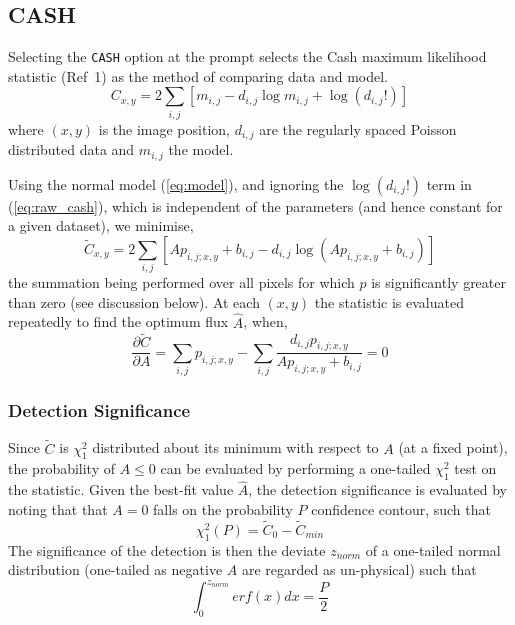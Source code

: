 \subsection{CASH}
\label{alg:cash}
Selecting the \verb+CASH+ option at the  prompt selects the
Cash maximum likelihood statistic (Ref~1) as the method of comparing
data and model.
\begin{equation} \label{eq:raw_cash}
C_{x,y} = 2 \sum_{i,j} [ m_{i,j} - d_{i,j} \log m_{i,j} + \log (d_{i,j} !) ]
\end{equation}
where $(x,y)$ is the image position, $d_{i,j}$ are the regularly spaced
Poisson distributed data and $m_{i,j}$ the model. 

Using the normal model (\ref{eq:model}), and ignoring
the $\log( d_{i,j} ! )$ term in (\ref{eq:raw_cash}), which is independent
of the parameters (and hence constant for a given dataset), we minimise,
\begin{equation} \label{eq:cash_stat}
\tilde{C}_{x,y} = 2 \sum_{i,j} [ A p_{i,j;x,y} + b_{i,j} - d_{i,j} \log (
A p_{i,j;x,y} + b_{i,j}) ]
\end{equation}
the summation being performed over all pixels for which $p$ is
significantly greater than zero (see discussion below). At each $(x,y)$
the statistic is evaluated repeatedly to find the optimum flux $\hat{A}$,
when,
\begin{equation}
\frac{\partial \tilde{C}}{\partial A} = \sum_{i,j} p_{i,j;x,y} - \sum_{i,j}
\frac{d_{i,j}p_{i,j;x,y}}{A p_{i,j;x,y} + b_{i,j}} = 0
\end{equation}

\subsubsection{Detection Significance}

Since $\tilde{C}$ is $\chi^2_1$ distributed about its minimum with
respect to $A$ (at a fixed point), the probability of $A \leq 0$ can be
evaluated by performing a one-tailed $\chi^2_1$ test on the statistic.
Given the best-fit value $\hat{A}$, the detection significance is evaluated
by noting that that $A = 0$ falls on the probability $P$ confidence contour,
such that
\begin{equation}
\chi^2_1(P) = \tilde{C}_{0} - \tilde{C}_{min}
\end{equation}
The significance of the detection is then the deviate $z_{norm}$ of a
one-tailed normal distribution (one-tailed as negative $A$
are regarded as un-physical) such that
\begin{equation}
\int_{0}^{z_{norm}} erf(x) dx = \frac{P}{2}
\end{equation}

